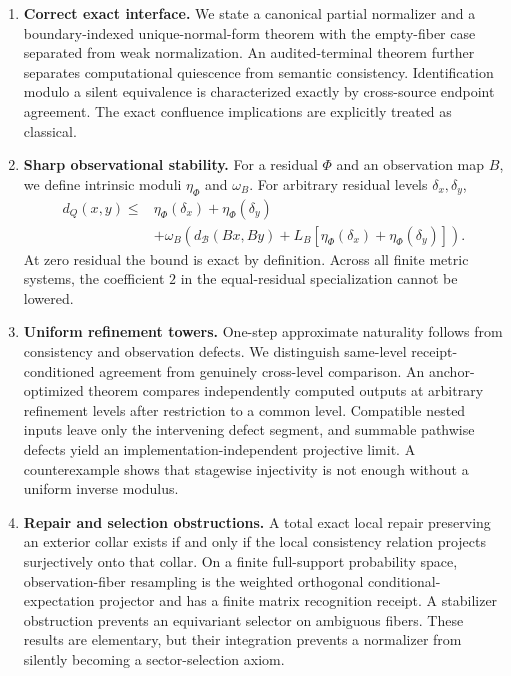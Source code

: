 \documentclass[11pt]{article}
\theoremstyle{definition}
\theoremstyle{remark}
\numberwithin{equation}{section}
\newcommand{\cB}{\mathcal B}
\begin{document}
\begin{enumerate}[label=\textbf{C\arabic*.},leftmargin=3.2em]
\item \textbf{Correct exact interface.}
We state a canonical partial normalizer and a boundary-indexed unique-normal-form theorem with the empty-fiber case separated from weak normalization.  An audited-terminal theorem further separates computational quiescence from semantic consistency.  Identification modulo a silent equivalence is characterized exactly by cross-source endpoint agreement.  The exact confluence implications are explicitly treated as classical.

\item \textbf{Sharp observational stability.}
For a residual $\Phi$ and an observation map $B$, we define intrinsic moduli $\eta_\Phi$ and $\omega_B$.  For arbitrary residual levels $\delta_x,\delta_y$,
\begin{equation}\label{eq:intro-master}
\begin{split}
 d_Q(x,y)\le{}&\eta_\Phi(\delta_x)+\eta_\Phi(\delta_y)\\
 &+\omega_B\!\left(
 d_{\cB}(Bx,By)+L_B[\eta_\Phi(\delta_x)+\eta_\Phi(\delta_y)]
 \right).
\end{split}
\end{equation}
At zero residual the bound is exact by definition.  Across all finite metric systems, the coefficient $2$ in the equal-residual specialization cannot be lowered.

\item \textbf{Uniform refinement towers.}
One-step approximate naturality follows from consistency and observation defects.  We distinguish same-level receipt-conditioned agreement from genuinely cross-level comparison.  An anchor-optimized theorem compares independently computed outputs at arbitrary refinement levels after restriction to a common level.  Compatible nested inputs leave only the intervening defect segment, and summable pathwise defects yield an implementation-independent projective limit.  A counterexample shows that stagewise injectivity is not enough without a uniform inverse modulus.

\item \textbf{Repair and selection obstructions.}
A total exact local repair preserving an exterior collar exists if and only if the local consistency relation projects surjectively onto that collar.  On a finite full-support probability space, observation-fiber resampling is the weighted orthogonal conditional-expectation projector and has a finite matrix recognition receipt.  A stabilizer obstruction prevents an equivariant selector on ambiguous fibers.  These results are elementary, but their integration prevents a normalizer from silently becoming a sector-selection axiom.


\end{enumerate}
\end{document}
